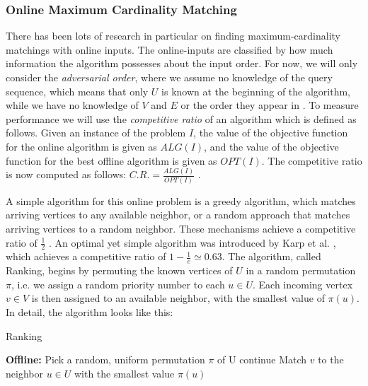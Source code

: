 \subsubsection{Online Maximum Cardinality Matching}
There has been lots of research in particular on finding maximum-cardinality matchings with online inputs. The online-inputs are classified by how much information the algorithm possesses about the input order. For now, we will only consider the \emph{adversarial order}, where we assume no knowledge of the query sequence, which means that only $U$ is known at the beginning of the algorithm, while we have no knowledge of $V$ and $E$ or the order they appear in \cite{Mehta:Online}. To measure performance we will use the \emph{competitive ratio} of an algorithm which is defined as follows. Given an instance of the problem $I$, the value of the objective function for the online algorithm is given as $ALG(I)$, and the value of the objective function for the best offline algorithm is given as $OPT(I)$. The competitive ratio is now computed as follows: $C.R.=\frac{ALG(I)}{OPT(I)}$ \cite{Mehta:Online}.

A simple algorithm for this online problem is a greedy algorithm, which matches arriving vertices to any available neighbor, or a random approach that matches arriving vertices to a random neighbor. These mechanisms achieve a competitive ratio of $\frac{1}{2}$ \cite{Mehta:Online}. An optimal yet simple algorithm was introduced by Karp et al. \cite{Karp:Online}, which achieves a competitive ratio of $1 - \frac{1}{e} \simeq 0.63$. The algorithm, called Ranking, begins by permuting the known vertices of $U$ in a random permutation $\pi$, i.e. we assign a random priority number to each $u \in U$. Each incoming vertex $v \in V$ is then assigned to an available neighbor, with the smallest value of $\pi(u)$. In detail, the algorithm looks like this:

\begin{algorithm} %
    \caption{Ranking} 
    \label{alg:ranking} %
    \begin{algorithmic} %
        \State \textbf{Offline:} Pick a random, uniform permutation $\pi$ of U
                \State continue
            \EndIf
            \State Match $v$ to the neighbor $u \in U$ with the smallest value $\pi(u)$
        \EndFor
    \end{algorithmic}
\end{algorithm}